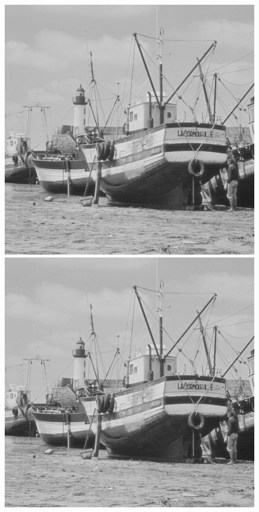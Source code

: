 \documentclass[12pt]{report}
\begin{document}
\begin{figure}[H]
\begin{center}
\includegraphics[scale=0.25]{../ImageRes/ImagedecodeeCompetitifQ2.jpg} 
\includegraphics[scale=0.25]{../ImageRes/ImagedecodeeCompetitifQ8.jpg} 

\end{center}
\end{figure}
\end{document}
